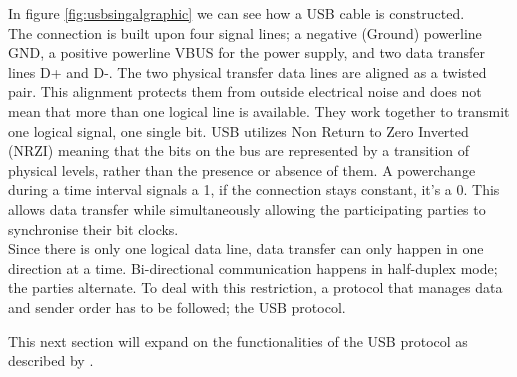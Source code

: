 In figure \ref{fig:usbsingalgraphic} we can see how a USB cable is constructed. \\
The connection is built upon four signal lines; a negative (Ground) powerline GND, a positive powerline VBUS for the power supply, and two data transfer lines D+ and D-. The two physical transfer data lines are aligned as a twisted pair. This alignment protects them from outside electrical noise and does not mean that more than one logical line is available. They work together to transmit one logical signal, one single bit. USB utilizes Non Return to Zero Inverted (NRZI) meaning that the bits on the bus are represented by a transition of physical levels, rather than the presence or absence of them. A powerchange during a time interval signals a 1, if the connection stays constant, it's a 0. This allows data transfer while simultaneously allowing the participating parties to synchronise their bit clocks.  \\
Since there is only one logical data line, data transfer can only happen in one direction at a time. Bi-directional communication happens in half-duplex mode; the parties alternate. To deal with this restriction, a protocol that manages data and sender order has to be followed; the USB protocol.  

This next section will expand on the functionalities of the USB protocol as described by \cite{nissimUSBbasedAttacks2017}. 

